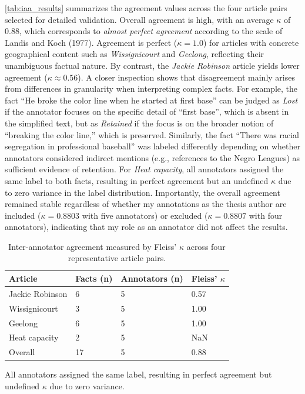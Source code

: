 \documentclass{DESSThesis}
\begin{document}
\autoref{tab:iaa_results} summarizes the agreement values across the four article pairs selected for detailed validation. Overall agreement is high, with an average $\kappa$ of 0.88, which corresponds to \textit{almost perfect agreement} according to the scale of Landis and Koch (1977)\cite{landis1977measurement}. Agreement is perfect ($\kappa=1.0$) for articles with concrete geographical content such as \textit{Wissignicourt} and \textit{Geelong}, reflecting their unambiguous factual nature.
By contrast, the \textit{Jackie Robinson} article yields lower agreement ($\kappa \approx 0.56$). A closer inspection shows that disagreement mainly arises from differences in granularity when interpreting complex facts. For example, the fact “He broke the color line when he started at first base” can be judged as \textit{Lost} if the annotator focuses on the specific detail of “first base”, which is absent in the simplified text, but as \textit{Retained} if the focus is on the broader notion of “breaking the color line,” which is preserved. Similarly, the fact “There was racial segregation in professional baseball” was labeled differently depending on whether annotators considered indirect mentions (e.g., references to the Negro Leagues) as sufficient evidence of retention. 
For \textit{Heat capacity}, all annotators assigned the same label to both facts, resulting in perfect agreement but an undefined $\kappa$ due to zero variance in the label distribution. Importantly, the overall agreement remained stable regardless of whether my annotations as the thesis author are included ($\kappa=0.8803$ with five annotators) or excluded ($\kappa=0.8807$ with four annotators), indicating that my role as an annotator did not affect the results.

\begin{table}[h]
\centering
\begin{threeparttable}
\begin{tabularx}{\textwidth}{lXXX}
\toprule
\textbf{Article} & \textbf{Facts (n)} & \textbf{Annotators (n)} & \textbf{Fleiss' $\kappa$} \\
\midrule
Jackie Robinson  & 6 & 5 & 0.57 \\
Wissignicourt    & 3 & 5 & 1.00 \\
Geelong          & 6 & 5 & 1.00 \\
Heat capacity    & 2 & 5 & NaN\tnote{*} \\
\midrule
Overall          & 17 & 5 & 0.88 \\
\bottomrule
\end{tabularx}

\begin{tablenotes}\footnotesize
\item[*] All annotators assigned the same label, resulting in perfect agreement but undefined $\kappa$ due to zero variance.
\end{tablenotes}
\end{threeparttable}
\caption{Inter-annotator agreement measured by Fleiss' $\kappa$ across four representative article pairs.}
\label{tab:iaa_results}
\end{table}
\end{document}
